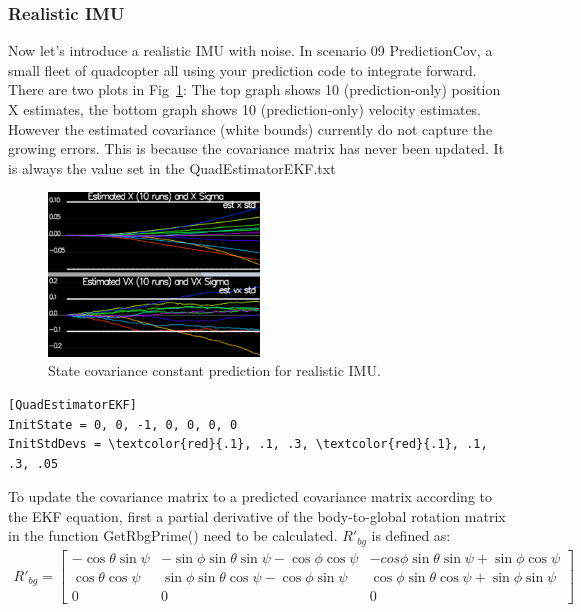 \documentclass[letterpaper]{article}
\begin{document}
\subsubsection{Realistic IMU}

Now let's introduce a realistic IMU with noise. In scenario 09 PredictionCov, a small fleet of quadcopter all using your prediction code to integrate forward. There are two plots in Fig~\ref{fig:real_imu}: The top graph shows 10 (prediction-only) position X estimates, the bottom graph shows 10 (prediction-only) velocity estimates. However the estimated covariance (white bounds) currently do not capture the growing errors. This is because the covariance matrix has never been updated. It is always the value set in the QuadEstimatorEKF.txt

\begin{figure}[ht]
\centering
\includegraphics[width=0.5\textwidth]{./images/scenario9_1.png}
\caption{\label{fig:real_imu} State covariance constant prediction for realistic IMU.}
\end{figure}

\begin{Verbatim}[frame=single, commandchars=\\\{\}]
[QuadEstimatorEKF]
InitState = 0, 0, -1, 0, 0, 0, 0
InitStdDevs = \textcolor{red}{.1}, .1, .3, \textcolor{red}{.1}, .1, .3, .05
\end{Verbatim}

To update the covariance matrix to a predicted covariance matrix according to the EKF equation, first a partial derivative of the body-to-global rotation matrix in the function GetRbgPrime() need to be calculated. $R'_{bg}$ is defined as:
\begin{align*}
R'_{bg} = \left[
  \begin{array}{ccc}
    -\cos \theta \sin \psi&
    -\sin\phi \sin \theta \sin \psi - \cos \phi \cos \psi&
    -cos \phi \sin \theta \sin \psi + \sin \phi \cos \psi\\
    \cos \theta \cos \psi&
    \sin \phi \sin \theta \cos \psi - \cos \phi \sin \psi&
    \cos \phi \sin \theta \cos \psi + \sin \phi \sin \psi\\
    0&0&0
  \end{array}
  \right]
\end{align*}
\end{document}

